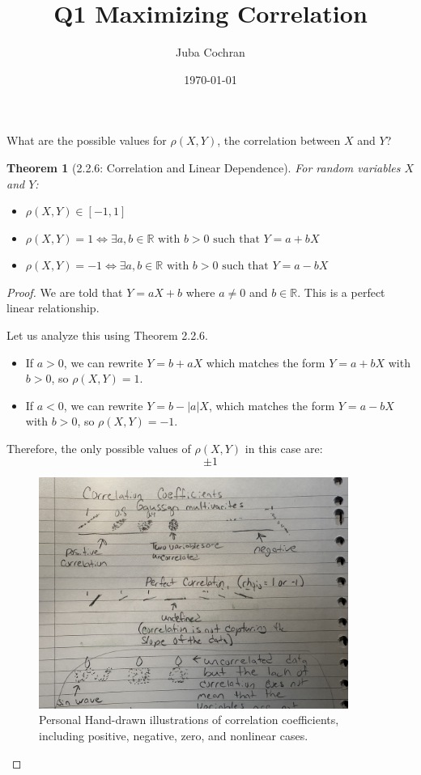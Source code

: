 \documentclass[12pt]{amsart}
\title{Q1 Maximizing Correlation}
\author{Juba Cochran}
\date{\today}
\newtheorem{thm}{Theorem}
\theoremstyle{remark}
\numberwithin{equation}{section}
\numberwithin{thm}{section}
\numberwithin{rmk}{section}
\numberwithin{figure}{section}
\begin{document}
\maketitle

\vspace{2em}
What are the possible values for $\rho(X,Y)$, the correlation between $X$ and $Y$? 
\vspace{2em}

\begin{thm}[2.2.6: Correlation and Linear Dependence]
For random variables $X$ and $Y$:
\begin{itemize}
    \item $\rho(X, Y) \in [-1, 1]$
    \item $\rho(X, Y) = 1 \iff \exists a, b \in \mathbb{R} \text{ with } b > 0 \text{ such that } Y = a + bX$
    \item $\rho(X, Y) = -1 \iff \exists a, b \in \mathbb{R} \text{ with } b > 0 \text{ such that } Y = a - bX$
\end{itemize}
\end{thm}

\begin{proof}
We are told that $Y = aX + b$ where $a \ne 0$ and $b \in \mathbb{R}$. This is a perfect linear relationship.

Let us analyze this using Theorem 2.2.6.

\begin{itemize}
    \item If $a > 0$, we can rewrite $Y = b + aX$ which matches the form $Y = a + bX$ with $b > 0$, so $\rho(X, Y) = 1$.
    \item If $a < 0$, we can rewrite $Y = b - |a|X$, which matches the form $Y = a - bX$ with $b > 0$, so $\rho(X, Y) = -1$.
\end{itemize}

Therefore, the only possible values of $\rho(X, Y)$ in this case are:
\[
\pm 1
\]

\begin{figure}[h]
    \centering
    \includegraphics[width=0.9\textwidth]{IMG_7685.JPG}
    \caption{Personal Hand-drawn illustrations of correlation coefficients, including positive, negative, zero, and nonlinear cases.}
    \label{fig:correlation-sketch}
\end{figure}

\end{proof}
\end{document}

